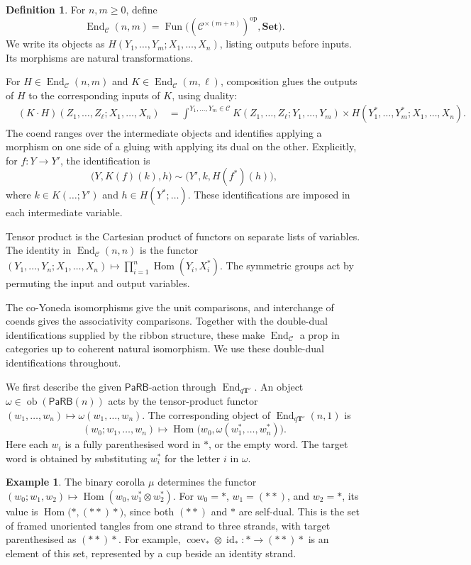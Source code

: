\documentclass{amsart}
\newcommand{\bT}{\mathbf{T}}
\newcommand{\calC}{\mathcal{C}}
\newcommand{\Set}{\mathbf{Set}}
\newcommand{\PaRB}{\mathsf{PaRB}}
\newcommand{\id}{\operatorname{id}}
\newcommand{\End}{\operatorname{End}}
\newcommand{\Hom}{\operatorname{Hom}}
\newcommand{\ob}{\operatorname{ob}}
\newcommand{\Fun}{\operatorname{Fun}}
\newcommand{\coev}{\operatorname{coev}}
\theoremstyle{definition}
\newtheorem{definition}[theorem]{Definition}%
\newtheorem{example}[theorem]{Example}%
\numberwithin{equation}{section}
\begin{document}
\begin{definition}
\label{def: categorical endomorphism prop}
For $n,m\geq0$, define
\[
\End_{\calC}(n,m)
=
\Fun\bigl((\calC^{\times(m+n)})^{\mathrm{op}},\Set\bigr).
\]
We write its objects as
$H(Y_1,\ldots,Y_m;X_1,\ldots,X_n)$, listing outputs before
inputs. Its morphisms are natural transformations.

For $H\in\End_{\calC}(n,m)$ and
$K\in\End_{\calC}(m,\ell)$, composition glues the outputs
of $H$ to the corresponding inputs of $K$, using duality:
\[
\begin{aligned}
&(K\cdot H)(Z_1,\ldots,Z_\ell;X_1,\ldots,X_n)
&=
\int^{Y_1,\ldots,Y_m\in\calC}
K(Z_1,\ldots,Z_\ell;Y_1,\ldots,Y_m)
\times
H(Y_1^*,\ldots,Y_m^*;X_1,\ldots,X_n).
\end{aligned}
\]
The coend ranges over the intermediate objects and identifies
applying a morphism on one side of a gluing with applying its
dual on the other. Explicitly, for $f\colon Y\to Y'$, the
identification is
\[
\bigl(Y,K(f)(k),h\bigr)
\sim
\bigl(Y',k,H(f^*)(h)\bigr),
\]
where $k\in K(\ldots;Y')$ and $h\in H(Y^*;\ldots)$.
These identifications are imposed in each intermediate variable.

Tensor product is the Cartesian product of functors on separate
lists of variables. The identity in $\End_{\calC}(n,n)$ is
the functor
$(Y_1,\ldots,Y_n;X_1,\ldots,X_n)
\mapsto\prod_{i=1}^n\Hom(Y_i,X_i^*)$.
The symmetric groups act by permuting the input and output
variables.
\end{definition}

The co-Yoneda isomorphisms give the unit comparisons, and
interchange of coends gives the associativity comparisons.
Together with the double-dual identifications supplied by the
ribbon structure, these make $\End_{\calC}$ a prop in categories
up to coherent natural isomorphism. We use these double-dual
identifications throughout.

We first describe the given $\PaRB$-action through
$\End_{q\bT'}$. An object $\omega\in\ob(\PaRB(n))$ acts
by the tensor-product functor
$(w_1,\ldots,w_n)\mapsto\omega(w_1,\ldots,w_n)$.
The corresponding object of $\End_{q\bT'}(n,1)$ is
\[
(w_0;w_1,\ldots,w_n)\longmapsto
\Hom\bigl(w_0,\omega(w_1^*,\ldots,w_n^*)\bigr).
\]
Here each $w_i$ is a fully parenthesised word in $*$, or the
empty word. The target word is obtained by substituting $w_i^*$
for the letter $i$ in $\omega$.

\begin{example}
The binary corolla $\mu$ determines the functor
$(w_0;w_1,w_2)\mapsto\Hom(w_0,w_1^*\otimes w_2^*)$.
For $w_0=*$, $w_1=(**)$, and $w_2=*$, its value is
$\Hom\bigl(*,(**)*\bigr)$,
since both $(**)$ and $*$ are self-dual. This is the set of
framed unoriented tangles from one strand to three strands,
with target parenthesised as $(**)*$. For example,
$\coev_*\otimes\id_*\colon *\to(**)*$ is an element of this
set, represented by a cup beside an identity strand.
\end{example}
\end{document}
